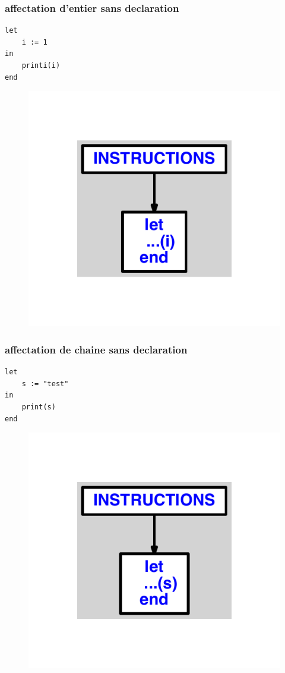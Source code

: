 \documentclass{article}
\begin{document}
\subsubsection{affectation d'entier sans declaration}
\begin{lstlisting}
let
	i := 1
in
	printi(i)
end
\end{lstlisting}
\newpage
\begin{figure}[H]
\centering
\includegraphics[max width=\textwidth]{ast/ast_291.pdf}
\end{figure}
\newpage
\subsubsection{affectation de chaine sans declaration}
\begin{lstlisting}
let
	s := "test"
in
	print(s)
end
\end{lstlisting}
\newpage
\begin{figure}[H]
\centering
\includegraphics[max width=\textwidth]{ast/ast_292.pdf}
\end{figure}
\newpage
\end{document}
